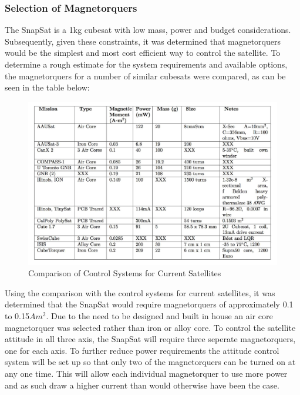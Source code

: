 \subsubsection{Selection of Magnetorquers}
The SnapSat is a 1kg cubesat with low mass, power and budget considerations. Subsequently, given these constraints, it was determined that magnetorquers would be the simplest and most cost efficient way to control the satellite.  To determine a rough estimate for the system requirements and available options, the magnetorquers for a number of similar cubesats were compared, as can be seen in the table below:\\
\vspace{-6mm}
\begin{center}
    \begin{figure}[H]
        \caption{Comparison of Control Systems for Current Satellites \cite{Miller}}
        \vspace{-4mm}
        \centering
        \includegraphics[scale = 0.4]{./figures/Magnetic_Moment}
    \end{figure}
\end{center}
\vspace{-5mm}
Using the comparison with the control systems for current satellites, it was determined that the SnapSat would require magnetorquers of approximately 0.1 to 0.15$Am^2$.  Due to the need to be designed and built in house an air core magnetorquer was selected rather than iron or alloy core.  To control the satellite attitude in all three axis, the SnapSat will require three seperate magnetorquers, one for each axis.  To further reduce power requirements the attitude control system will be set up so that only two of the magnetorquers can be turned on at any one time.  This will allow each individual magnetorquer to use more power and as such draw a higher current than would otherwise have been the case.

